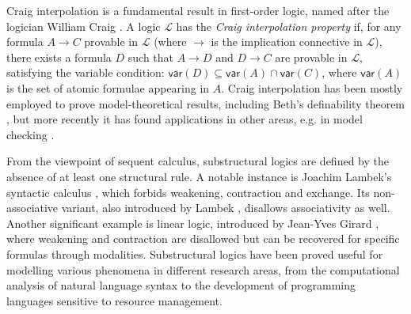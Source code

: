 \documentclass[sn-mathphys-num]{sn-jnl}%
\newcommand{\mc}[1]{\mathcal{#1}}
\newcommand{\mf}[1]{\mathsf{#1}}
\newcommand{\vars}[1]{\mf{var} (#1)}
\theoremstyle{thmstyleone}%
\theoremstyle{thmstyletwo}%
\theoremstyle{thmstylethree}%
\begin{document}

Craig interpolation is a fundamental result in first-order logic, named after the logician William Craig \cite{craig:interpolation:1957}.
A logic $\mc{L}$ has the \emph{Craig interpolation property} if, for any formula $A \to C$ provable in $\mc{L}$ (where $\to$ is the implication connective in $\mc{L}$), there exists a formula $D$ such that $A \to D$ and $D \to C$ are provable in $\mc{L}$, satisfying the variable condition: $\vars{D} \subseteq \vars{A} \cap \vars{C}$, where $\vars{A}$ is the set of atomic formulae appearing in $A$.
Craig interpolation has been mostly employed to prove model-theoretical results, including Beth's definability theorem \cite{Beth1953}, but more recently it has found applications in other areas, e.g. in model checking \cite{Henzinger2004}.

From the viewpoint of sequent calculus, substructural logics are defined by the absence of at least one structural rule.
A notable instance is Joachim Lambek's syntactic calculus \cite{lambek:mathematics:58}, which forbids weakening, contraction and exchange.
Its non-associative variant, also introduced by Lambek \cite{Lambek1961},
disallows associativity as well. Another significant example is linear logic, introduced by Jean-Yves Girard \cite{girard:linear:87}, where weakening and contraction are disallowed but can be recovered for specific formulas through modalities.
Substructural logics have been proved useful for modelling various phenomena in different research areas, from the computational analysis of natural language syntax to the development of programming languages sensitive to resource management.
\end{document}

